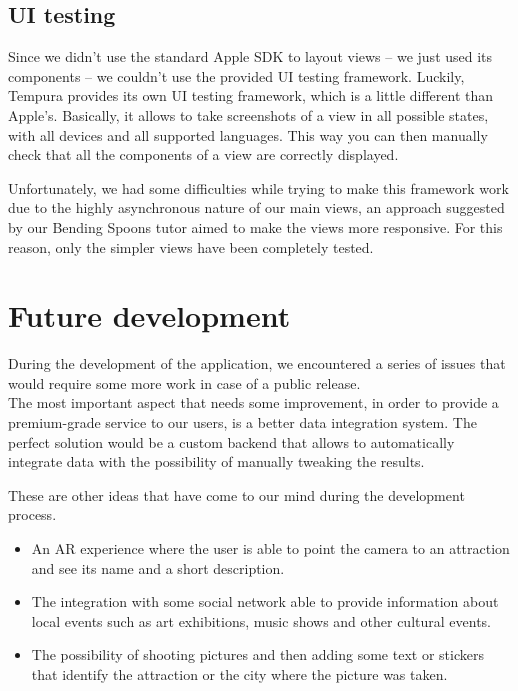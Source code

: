 \documentclass[a4paper, 11pt, parskip=half]{scrreprt}
\theoremstyle{definition}
\begin{document}
\section{UI testing}

Since we didn't use the standard Apple SDK to layout views -- we just used its components -- we couldn't use the provided UI testing framework. Luckily, Tempura provides its own UI testing framework, which is a little different than Apple's. Basically, it allows to take screenshots of a view in all possible states, with all devices and all supported languages. This way you can then manually check that all the components of a view are correctly displayed.

Unfortunately, we had some difficulties while trying to make this framework work due to the highly asynchronous nature of our main views, an approach suggested by our Bending Spoons tutor aimed to make the views more responsive. For this reason, only the simpler views have been completely tested.




\chapter{Future development}

During the development of the application, we encountered a series of issues that would require some more work in case of a public release.\\
The most important aspect that needs some improvement, in order to provide a premium-grade service to our users, is a better data integration system. The perfect solution would be a custom backend that allows to automatically integrate data with the possibility of manually tweaking the results. 

These are other ideas that have come to our mind during the development process.
\begin{itemize}
    \item An AR experience where the user is able to point the camera to an attraction and see its name and a short description.
    \item The integration with some social network able to provide information about local events such as art exhibitions, music shows and other cultural events.
    \item The possibility of shooting pictures and then adding some text or stickers that identify the attraction or the city where the picture was taken.
\end{itemize}
\end{document}
